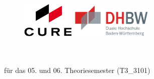 

\begin{titlepage}

\centering
\begin{figure}[t]
    \begin{minipage}[]{0.49\textwidth}
        \flushleft
        \includegraphics[width=2.5cm]{images/essential/firmenlogo.png}
    \end{minipage}
    \begin{minipage}[]{0.49\textwidth}
        \flushright
        \includegraphics[width=3.9cm]{images/essential/dhbw.png}
    \end{minipage}
\end{figure}

\enlargethispage{20mm}

\begin{center}
	\vspace*{6mm}	{\arbeit}\\
	\doublespacing
	\vspace*{12mm}	{\LARGE\textbf{{\titel}}}\\
	\onehalfspacing
	\vspace*{24mm}	für das 05. und 06. Theoriesemester (T3\_3101)\\
	\vspace*{3mm}		\langartikelstudiengang{} \langstudiengang{} \textbf{\studiengang}\\
	\vspace*{3mm}		\langanderdh{} \dhbw\\
	\vspace*{7mm}	\langvon\\
	\vspace*{3mm}		{\large\textbf \autor}\\
	\vspace*{7mm}	\datumAbgabe\\
\end{center}


\end{titlepage}
